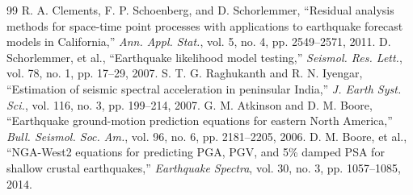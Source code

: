 \documentclass[journal]{IEEEtran}
\begin{document}
\begin{thebibliography}{99}
 R. A. Clements, F. P. Schoenberg, and D. Schorlemmer, ``Residual analysis methods for space-time point processes with applications to earthquake forecast models in California,'' \textit{Ann. Appl. Stat.}, vol. 5, no. 4, pp. 2549–2571, 2011.
 D. Schorlemmer, et al., ``Earthquake likelihood model testing,'' \textit{Seismol. Res. Lett.}, vol. 78, no. 1, pp. 17–29, 2007.
 S. T. G. Raghukanth and R. N. Iyengar, ``Estimation of seismic spectral acceleration in peninsular India,'' \textit{J. Earth Syst. Sci.}, vol. 116, no. 3, pp. 199–214, 2007.
 G. M. Atkinson and D. M. Boore, ``Earthquake ground-motion prediction equations for eastern North America,'' \textit{Bull. Seismol. Soc. Am.}, vol. 96, no. 6, pp. 2181–2205, 2006.
 D. M. Boore, et al., ``NGA-West2 equations for predicting PGA, PGV, and 5\% damped PSA for shallow crustal earthquakes,'' \textit{Earthquake Spectra}, vol. 30, no. 3, pp. 1057–1085, 2014.
\end{thebibliography}
\end{document}
